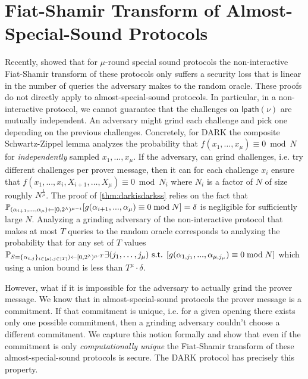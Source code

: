 \section{Fiat-Shamir Transform of Almost-Special-Sound Protocols} 
Recently, \cite{EPRINT:Wikstrom21,EPRINT:AttFehKlo21} showed that for $\mu$-round special sound protocols the non-interactive Fiat-Shamir transform of these protocols only suffers a security loss that is linear in the number of queries the adversary makes to the random oracle. These proofs do not directly apply to almost-special-sound protocols. In particular, in a non-interactive protocol, we cannot guarantee that the challenges on $\textsf{lpath}(\nu)$ are mutually independent. An adversary might grind each challenge and pick one depending on the previous challenges. Concretely, for DARK the composite Schwartz-Zippel lemma analyzes the probability that $f(x_1,\dots,x_\mu)\equiv 0 \bmod N$ for \emph{independently} sampled $x_1,\dots,x_\mu$. If the adversary, can grind challenges, i.e. try different challenges per prover message, then it can for each challenge $x_i$ ensure that $f(x_1,\dots,x_i,X_{i+1},\dots,X_\mu)\equiv 0 \bmod N_i$ where $N_i$ is a factor of $N$ of size roughly $N^{\frac{1}{\mu}}$. The proof of \cref{thm:darkisdarkss} relies on the fact that $\mathbb{P}_{(\alpha_{i+1},...,\alpha_\mu) \gets [0,2^\lambda)^{\mu -i}} [g(\alpha_{i+1},...,\alpha_\mu)\equiv 0 \bmod N]=\delta$ is negligible for sufficiently large $N$. Analyzing a grinding adversary of the non-interactive protocol that makes at most $T$ queries to the random oracle corresponds to analyzing the probability that for any set of $T$ values $\mathbb{P}_{S=\{\alpha_{i,j}\}_{i\in [\mu], j \in [T]}) \gets [0,2^\lambda)^{\mu \cdot T}}  \exists (j_1,\dots,j_\mu) \text{ s.t. } [g(\alpha_{1,j_1},...,\alpha_{\mu,j_\mu})\equiv 0 \bmod N]$ which using a union bound is less than $T^\mu \cdot \delta$.

However, what if it is impossible for the adversary to actually grind the prover message. We know that in almost-special-sound protocols the prover message is a commitment. If that commitment is unique, i.e. for a given opening there exists only one possible commitment, then a grinding adversary couldn't choose a different commitment. We capture this notion formally and show that even if the commitment is only \emph{computationally unique} the Fiat-Shamir transform of these almost-special-sound protocols is secure. The DARK protocol has precisely this property.


